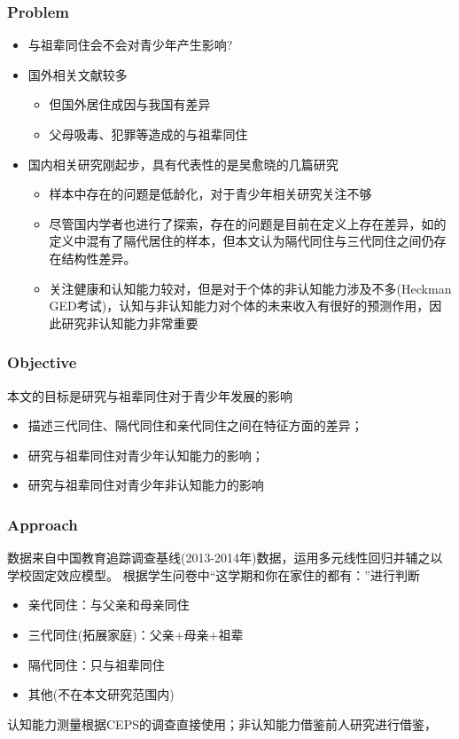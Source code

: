 \documentclass{beamer}
\begin{document}
\begin{frame}
	\frametitle{Problem} 
	\begin{itemize}
		\item 与祖辈同住会不会对青少年产生影响?
		\item 国外相关文献较多
		\begin{itemize}
			\item 但国外居住成因与我国有差异
			\item 父母吸毒、犯罪等造成的与祖辈同住
 		\end{itemize}
		\item 国内相关研究刚起步，具有代表性的是吴愈晓的几篇研究\citep{吴愈晓2019,吴愈晓2018,张帆2020}
		\begin{itemize}
			\item 样本中存在的问题是低龄化，对于青少年相关研究关注不够
			\item 尽管国内学者也进行了探索，存在的问题是目前在定义上存在差异，如\citet{张帆2020}的定义中混有了隔代居住的样本，但本文认为隔代同住与三代同住之间仍存在结构性差异。
			\item 关注健康和认知能力较对，但是对于个体的非认知能力涉及不多(Heckman GED考试)，认知与非认知能力对个体的未来收入有很好的预测作用，因此研究非认知能力非常重要
		\end{itemize}	
	\end{itemize}
\end{frame}


\begin{frame}
	\frametitle{Objective}
	本文的目标是研究与祖辈同住对于青少年发展的影响
	\begin{itemize}
		\item 描述三代同住、隔代同住和亲代同住之间在特征方面的差异；
		\item 研究与祖辈同住对青少年认知能力的影响；
		\item 研究与祖辈同住对青少年非认知能力的影响
	\end{itemize}
\end{frame}


\begin{frame}
	\frametitle{Approach}
数据来自中国教育追踪调查基线(2013-2014年)数据，运用多元线性回归并辅之以学校固定效应模型。
根据学生问卷中“这学期和你在家住的都有：”进行判断
	\begin{itemize}
		\item 亲代同住：与父亲和母亲同住
		\item 三代同住(拓展家庭)：父亲+母亲+祖辈
		\item 隔代同住：只与祖辈同住
		\item 其他(不在本文研究范围内)
	\end{itemize}
	认知能力测量根据CEPS的调查直接使用；非认知能力借鉴前人研究进行借鉴，
\end{frame}
\end{document}
